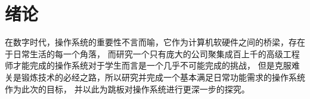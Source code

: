 \chapter{绪论}
在数字时代，操作系统的重要性不言而喻，它作为计算机软硬件之间的桥梁，存在于日常生活的每一个角落，
而研究一个只有庞大的公司聚集成百上千的高级工程师才能完成的操作系统对于学生而言是一个几乎不可能完成的挑战，
但是克服难关是锻炼技术的必经之路\cite{30_osKawaiHidemi200630}，所以研究并完成一个基本满足日常功能需求的操作系统作为此次的目标，
并以此为跳板对操作系统进行更深一步的探究。